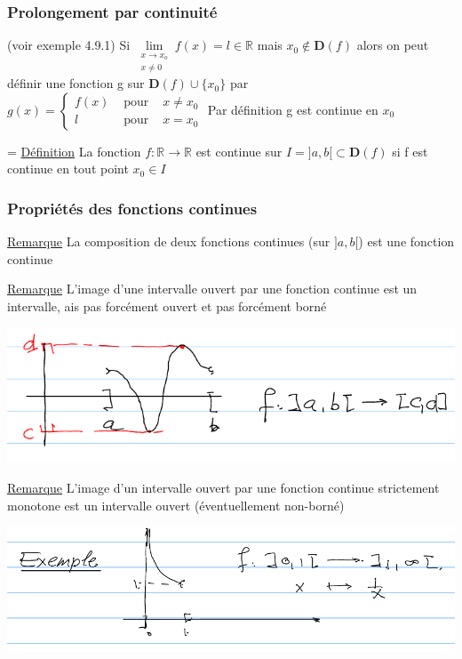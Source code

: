 \documentclass[12pt,a4paper]{article}
\newcommand{\limite}{\lim\limits_}
\newcommand{\R}{\ensuremath{\mathbb{R}} }
\newcommand{\rtor}{\ensuremath{\R \to \R} }
\newcommand{\pour}{\mbox{ pour }}
\newcommand{\Remarque}{\underline{Remarque} }
\newcommand{\Definition}{\underline{Définition} }
\begin{document}
{\subsubsection*{Prolongement par continuité}(voir exemple 4.9.1)
Si $\limite{\substack{x \to x_o \\ x \neq 0}} f(x) = l \in  \R$ mais $x_0 \not \in \mathbf{D}(f)$ alors on peut définir une fonction g sur $\mathbf{D}(f) \cup \{x_0\}$ par\\
$g(x) = \left\{
\begin{array}{lll}
f(x) & \pour & x \neq x_0\\
l & \pour& x= x_0
\end{array}
\right.$
Par définition g est continue en $x_0$
\begin{boite}=  
\Definition La fonction $f : \rtor$ est continue sur $I = ]a,b[ \subset \mathbf{D}(f)$ si f est continue en tout point $x_0 \in I$
\end{boite}
\subsubsection{Propriétés des fonctions continues}
\begin{boite}
\Remarque La composition de deux fonctions continues (sur $]a,b[$) est une fonction continue
\end{boite}
\begin{boite}
\Remarque L'image d'une intervalle ouvert par une fonction continue est un intervalle, ais pas forcément ouvert et pas forcément borné
\end{boite}
\includegraphics[scale=0.5]{Illustrations_Analyse/interv_ouvert}
\begin{boite}
\Remarque L'image d'un intervalle ouvert par une fonction continue strictement monotone est un intervalle ouvert (éventuellement non-borné)
\end{boite}
\includegraphics[scale=0.5]{Illustrations_Analyse/interv_mono}
}
\end{document}
